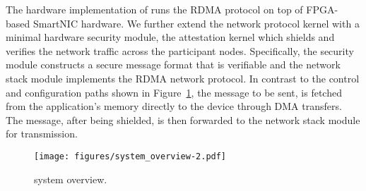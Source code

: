 The hardware implementation of \projecttitle{} runs the RDMA protocol on top of FPGA-based SmartNIC hardware. We further extend the network protocol kernel with a minimal hardware security module, the attestation kernel which shields and verifies the network traffic across the participant nodes. Specifically, the security module  constructs a secure message format that is verifiable and the network stack module implements the RDMA network protocol. In contrast to the control and configuration paths shown in Figure~\ref{fig:overview}, the message to be sent, is fetched from the application's memory directly to the device through DMA transfers. The message, after being shielded, is then forwarded to the network stack module for transmission.  %


\begin{figure}[t!]
    \centering
    \texttt{[image: figures/system\_overview-2.pdf]}
    \caption{\projecttitle{} system overview.}
    \label{fig:overview}
\end{figure}
